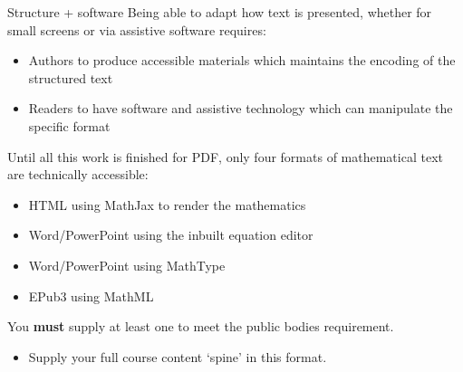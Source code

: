\documentclass[
  ignorenonframetext,
]{beamer}
\providecommand{\tightlist}{%
  \setlength{\itemsep}{0pt}\setlength{\parskip}{0pt}}
\begin{document}
\begin{frame}{Structure + software}
\label{structure-software}
Being able to adapt how text is presented, whether for small screens or
via assistive software requires:

\begin{itemize}
\tightlist
\item
  Authors to produce accessible materials which maintains the encoding
  of the structured text
\item
  Readers to have software and assistive technology which can manipulate
  the specific format
\end{itemize}

Until all this work is finished for PDF, only four formats of
mathematical text are technically accessible:

\begin{itemize}
\tightlist
\item
  HTML using MathJax to render the mathematics
\item
  Word/PowerPoint using the inbuilt equation editor
\item
  Word/PowerPoint using MathType
\item
  EPub3 using MathML
\end{itemize}

You \textbf{must} supply at least one to meet the public bodies
requirement.

\begin{itemize}
\tightlist
\item
  Supply your full course content `spine' in this format.
\end{itemize}
\end{frame}
\end{document}
